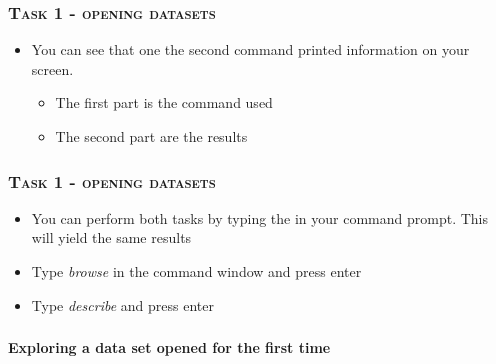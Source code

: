 \documentclass[10pt]{beamer}
\begin{document}
	\begin{frame}
			\frametitle{\textsc{Task 1 - opening datasets}}

		\begin{itemize}
			\item You can see that one the second command printed information on your screen.
			\begin{itemize}
				\item The first part is the command used
				\item The second part are the results
			\end{itemize}
		\end{itemize}

		 \begin{figure}[H] 
				\centering
		\end{figure}
	\end{frame}



	\begin{frame}
			\frametitle{\textsc{Task 1 - opening datasets}}
		\begin{itemize}
			\item You can perform both tasks by typing the in your command prompt. 
				  This will yield the same results
			\item Type \textit{browse} in the command window and press enter
			\item Type \textit{describe} and press enter
			
		\end{itemize}
	\end{frame}

	\begin{frame}
		\frametitle{\textsc{}}
		\begin{center}
			\Large  \textbf{Exploring a data set opened for the first time}
		\end{center}
	\end{frame}
\end{document}
